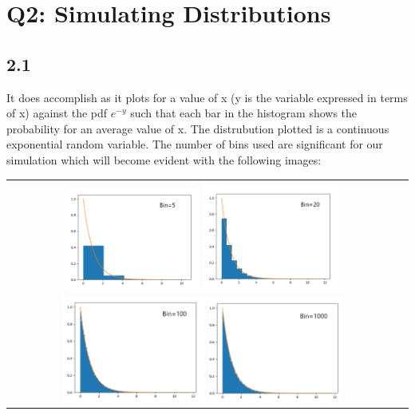 \documentclass[answers]{exam}
\begin{document}
\newpage
\section*{Q2: Simulating Distributions}

  \subsection*{2.1}
        It does accomplish as it plots for a value of x (y is the variable expressed in terms of x) against the pdf $e^{-y}$ such that each bar in the histogram shows the probability for an average value of x. The distrubution plotted is a continuous exponential random variable. The number of bins used are significant for our simulation which will become evident with the following images:
        \begin{center}
          \begin{tabular}{cc}
            \includegraphics[width= 0.35\textwidth]{"Q2/bin5.png"}
            \includegraphics[width= 0.36\textwidth]{"Q2/bin20.png"}\\
            \includegraphics[width= 0.375\textwidth]{"Q2/bin100.png"}
            \includegraphics[width= 0.35\textwidth]{"Q2/bin1000.png"}    
          \end{tabular}
        
       
      \end{center} 
\end{document}
